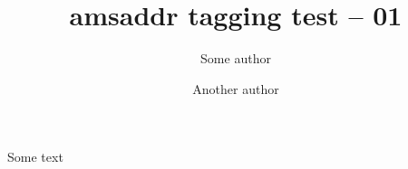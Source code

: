 \documentclass{amsart}
\title{amsaddr tagging test -- 01}
\author{Some author}
\author{Another author}
\begin{document}
\maketitle

Some text
\end{document}
